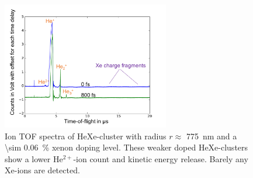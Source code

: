 %
%
\begin{figure}
 	\centering
 		\includegraphics[width=0.65\textwidth]{images/results/TOF-helium-xenon-cluster-13-2.png}
 	\caption[TOF spectra of HeXe-clusters with \SI{\sim 0.06}{\percent} Xe-doping at various delays.]{Ion TOF spectra of HeXe-cluster with radius $r\approx$ \SI{775}{\nano\meter} and a \SI{\sim 0.06}{\percent} xenon doping level. These weaker doped HeXe-clusters show a lower He$^{2+}$-ion count and kinetic energy release. Barely any Xe-ions are detected.}
 	\label{fig:TOF-helium-xenon-cluster-13}
\end{figure}
%

